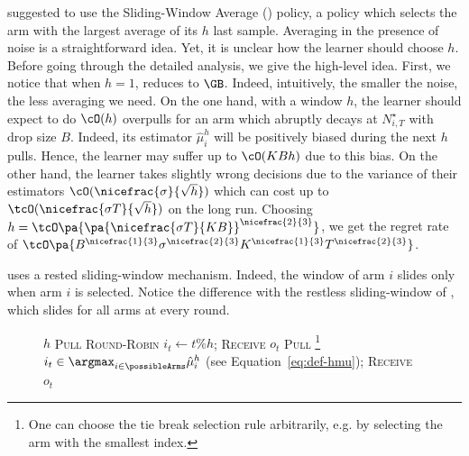 \citet{levine2017rotting} suggested to use the Sliding-Window Average (\SWA) policy, a policy which selects the arm with the largest average of its $h$ last sample. Averaging in the presence of noise is a straightforward idea. Yet, it is unclear how the learner should choose $h$. Before going through the detailed analysis, we give the high-level idea. First, we notice that when $h=1$, \SWA reduces to $\GB$. Indeed, intuitively, the smaller the noise, the less averaging we need. On the one hand, with a window $h$, the learner should expect to do $\cO(h)$ overpulls for an arm which abruptly decays at $N_{i,T}^\star$ with drop size $B$. Indeed, its estimator $\hat{\mu}_i^h$ will be positively biased during the next $h$ pulls. Hence, the learner may suffer up to $\cO(KBh)$ due to this bias. On the other hand, the learner takes slightly wrong decisions due to the variance of their estimators $\cO(\nicefrac{\sigma}{\sqrt{h}})$ which can cost up to $\tcO(\nicefrac{\sigma T}{\sqrt{h}})$ on the long run. Choosing $h = \tcO\pa{\pa{\nicefrac{ \sigma T}{KB}}^{\nicefrac{2}{3}}}$, we get the regret rate of $\tcO\pa{B^{\nicefrac{1}{3}} \sigma^{\nicefrac{2}{3}} K^{\nicefrac{1}{3}} T^{\nicefrac{2}{3}}}$. 
\begin{remark}
\SWA uses a rested sliding-window mechanism. Indeed, the window of arm $i$ slides only when arm $i$ is selected. Notice the difference with the restless sliding-window of \SWUCB \citep{garivier2011upper-confidence-bound}, which slides for all arms at every round.
\end{remark}
\begin{figure}[!ht]
\begin{minipage}{\textwidth}
\renewcommand*\footnoterule{}
\begin{savenotes}
\begin{algorithm}[H]
\caption{{\SWA} \citep{levine2017rotting} }
\label{alg:SWA}
\begin{algorithmic}[1]
\Require $h$
	 	\State \textsc{Pull Round-Robin}  $i_t \gets t \% h $;
	 	\State \textsc{Receive} $o_{t}$
	\EndFor
		\State \textsc{Pull} \footnote{One can choose the tie break selection rule arbitrarily, e.g. by selecting the arm with the smallest index.}  $i_t \in \argmax_{i \in \possibleArms} \hat{\mu}_{i}^h$ (see Equation~\ref{eq:def-hmu});
		\State \textsc{Receive} $o_{t}$
	\EndFor
\end{algorithmic}
\end{algorithm}
\end{savenotes}
\end{minipage}
\end{figure}
%
